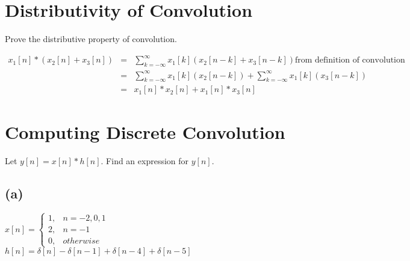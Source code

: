 \documentclass[11pt]{article}
\begin{document}
\section{Distributivity of Convolution}
Prove the distributive property of convolution.

{\color{blue}
\begin{eqnarray*}
x_1[n]*\left(x_2[n]+x_3[n] \right) &=& \sum\limits_{k=-\infty}^\infty x_1[k] \left(x_2[n-k]+x_3[n-k] \right) \text{from definition of convolution} \\
&=& \sum\limits_{k=-\infty}^\infty x_1[k] \left(x_2[n-k]\right)+\sum\limits_{k=-\infty}^\infty x_1[k] \left(x_3[n-k] \right) \\
&=& x_1[n]*x_2[n] + x_1[n]*x_3[n] 
\end{eqnarray*}
}

\section{Computing Discrete Convolution}
Let $y[n]=x[n]*h[n]$. Find an expression for $y[n]$.
\subsection*{(a)}
$x[n] = \begin{cases} 1, & n = -2,0,1 \\ 2, & n = -1\\ 0, & otherwise \end{cases}$
\\
$h[n]=\delta[n]-\delta[n-1]+\delta[n-4]+\delta[n-5]$
\end{document}
